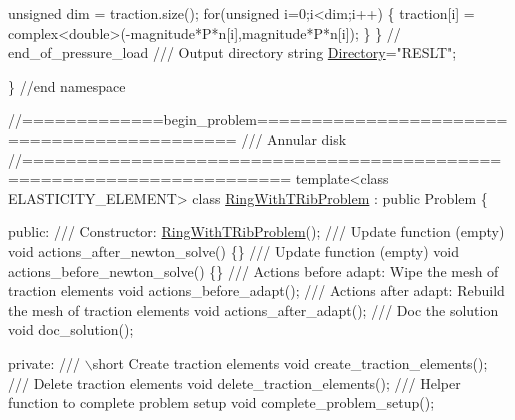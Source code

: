\begin{DoxyCodeInclude}
  \textcolor{keywordtype}{unsigned} dim = traction.size();
  \textcolor{keywordflow}{for}(\textcolor{keywordtype}{unsigned} i=0;i<dim;i++)
   \{
    traction[i] = complex<double>(-magnitude*P*n[i],magnitude*P*n[i]);
   \}
 \} \textcolor{comment}{// end\_of\_pressure\_load}
\textcolor{comment}{}
\textcolor{comment}{ /// Output directory}
\textcolor{comment}{} \textcolor{keywordtype}{string} \hyperlink{namespaceGlobal__Parameters_a301ab922df72030c660b21328d6caf76}{Directory}=\textcolor{stringliteral}{"RESLT"};
 
\} \textcolor{comment}{//end namespace}



\textcolor{comment}{//=============begin\_problem============================================ }\textcolor{comment}{}
\textcolor{comment}{/// Annular disk}
\textcolor{comment}{}\textcolor{comment}{//====================================================================== }
\textcolor{keyword}{template}<\textcolor{keyword}{class} ELASTICITY\_ELEMENT>
\textcolor{keyword}{class }\hyperlink{classRingWithTRibProblem}{RingWithTRibProblem} : \textcolor{keyword}{public} Problem
\{

\textcolor{keyword}{public}:
\textcolor{comment}{}
\textcolor{comment}{ /// Constructor:}
\textcolor{comment}{} \hyperlink{classRingWithTRibProblem}{RingWithTRibProblem}();
 \textcolor{comment}{}
\textcolor{comment}{ /// Update function (empty)}
\textcolor{comment}{} \textcolor{keywordtype}{void} actions\_after\_newton\_solve() \{\}
\textcolor{comment}{}
\textcolor{comment}{ /// Update function (empty)}
\textcolor{comment}{} \textcolor{keywordtype}{void} actions\_before\_newton\_solve() \{\}
\textcolor{comment}{}
\textcolor{comment}{ /// Actions before adapt: Wipe the mesh of traction elements}
\textcolor{comment}{} \textcolor{keywordtype}{void} actions\_before\_adapt();
\textcolor{comment}{}
\textcolor{comment}{ /// Actions after adapt: Rebuild the mesh of traction elements}
\textcolor{comment}{} \textcolor{keywordtype}{void} actions\_after\_adapt();
\textcolor{comment}{}
\textcolor{comment}{ /// Doc the solution}
\textcolor{comment}{} \textcolor{keywordtype}{void} doc\_solution();

\textcolor{keyword}{private}:
\textcolor{comment}{}
\textcolor{comment}{ /// \(\backslash\)short Create traction elements}
\textcolor{comment}{} \textcolor{keywordtype}{void} create\_traction\_elements();
\textcolor{comment}{}
\textcolor{comment}{ /// Delete traction elements}
\textcolor{comment}{} \textcolor{keywordtype}{void} delete\_traction\_elements();
\textcolor{comment}{}
\textcolor{comment}{ /// Helper function to complete problem setup}
\textcolor{comment}{} \textcolor{keywordtype}{void} complete\_problem\_setup();


\end{DoxyCodeInclude}

